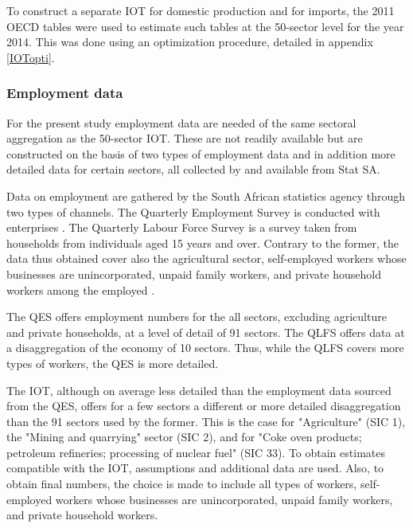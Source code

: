 \documentclass[12pt,english]{article}
\begin{document}
To construct a separate IOT for domestic production and for imports, the 2011 OECD tables were used to estimate such tables at the 50-sector level for the year 2014. This was done using an optimization procedure, detailed in appendix \ref{IOTopti}.


\subsubsection{Employment data}
For the present study employment data are needed of the same sectoral aggregation as the 50-sector IOT. These are not readily available but are constructed on the basis of two types of employment data and in addition more detailed data for certain sectors, all collected by and available from Stat SA.
 
Data on employment are gathered by the South African statistics agency through two types of channels. The Quarterly Employment Survey is conducted with enterprises \citep{QES2018}. The Quarterly Labour Force Survey is a survey taken from households from individuals aged 15 years and over. Contrary to the former, the data thus obtained cover also the agricultural sector, self-employed workers whose businesses are unincorporated, unpaid family workers, and private household workers among the employed \citep{QLFS2018}.

The QES offers employment numbers for the all sectors, excluding agriculture and private households, at a level of detail of 91 sectors. The QLFS offers data at a disaggregation of the economy of 10 sectors. Thus, while the QLFS covers more types of workers, the QES is more detailed.

The IOT, although on average less detailed than the employment data sourced from the QES, offers for a few sectors a different or more detailed disaggregation than the 91 sectors used by the former. This is the case for "Agriculture" (SIC 1), the "Mining and quarrying" sector (SIC 2), and for "Coke oven products; petroleum refineries; processing of nuclear fuel" (SIC 33). To obtain estimates compatible with the IOT, assumptions and additional data are used. Also, to obtain final numbers, the choice is made to include all types of workers, self-employed workers whose businesses are unincorporated, unpaid family workers, and private household workers. %
 
\end{document}
